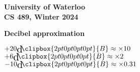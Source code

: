\documentclass[12pt]{article}
\def\decibel{\scalerel{$d$\kern-1.4pt}{\clipbox{2pt 0pt 0pt 0pt}{B}}}
\begin{document}
\begin{center}
  {\Large\bf University of Waterloo}\\ \vspace{3mm}
  {\Large\bf CS 489, Winter 2024}\\ \vspace{2mm}
\end{center}

\def\question#1{\item[\bf #1.]}
\def\part#1{\item[\bf #1)]}
\newcommand{\pc}[1]{\mbox{\textbf{#1}}} %

\begin{minipage}[t]{0.33\textwidth} %
	\textbf{Decibel approximation}
	
 		$+20 \decibel \approx \times 10$ \\
 		$+6 \decibel \approx \times 2$ \\
 		$-10 \decibel \approx \times 0.31$ \\
	
\end{minipage}

\begin{minipage}[t]{0.33\textwidth} %
	
\end{minipage}

\begin{minipage}[t]{0.33\textwidth} %
	
\end{minipage}
\end{document}
